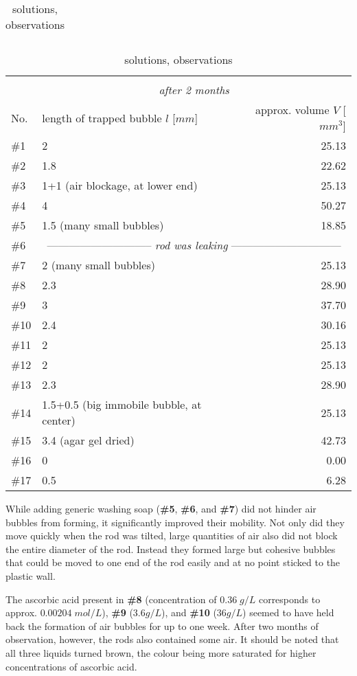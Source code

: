 \begin{table}[]
\begin{tabular}{l|lc|lc|lc}
\bottomrule
\end{tabular}
\begin{tabular}{l|lr}
\multicolumn{3}{c}{}								\\
& \multicolumn{2}{c}{\textit{after 2 months}}					\\ 
No. & length of trapped bubble $l$ [$mm$] 	& approx. volume $V$ [$mm^3$]	\\
\toprule
\#1   & 2					& 25.13				\\
\#2   & 1.8					& 22.62				\\
\#3   & 1+1 (air blockage, at lower end)	& 25.13				\\
\#4   & 4					& 50.27				\\
\#5   & 1.5 (many small bubbles)		& 18.85				\\
\#6   & \multicolumn{2}{c}{-----------------------------\textit{ rod was leaking }------------------------------}\\
\#7   & 2 (many small bubbles)			& 25.13				\\
\#8   & 2.3					& 28.90				\\
\#9   & 3					& 37.70				\\
\#10  & 2.4					& 30.16				\\
\#11  & 2					& 25.13				\\
\#12  & 2					& 25.13				\\
\#13  & 2.3					& 28.90				\\
\#14  & 1.5+0.5 (big immobile bubble, at center)	& 25.13				\\
\#15  & 3.4 (agar gel dried)			& 42.73				\\
\#16  & 0					& 0.00				\\
\#17  & 0.5					& 6.28				\\
\bottomrule
\end{tabular}
\caption{solutions, observations}
\label{tab:bubbles}
\end{table}


While adding generic washing soap (\textbf{\#5}, \textbf{\#6}, and \textbf{\#7}) did not hinder air bubbles from forming, it significantly improved their mobility.
Not only did they move quickly when the rod was tilted, large quantities of air also did not block the entire diameter of the rod.
Instead they formed large but cohesive bubbles that could be moved to one end of the rod easily and at no point sticked to the plastic wall.

The ascorbic acid present in \textbf{\#8} (concentration of $0.36 \; g/L$ corresponds to approx. $0.00204 \; mol/L$), \textbf{\#9} ($3.6 g/L$), and \textbf{\#10} ($36 g/L$) seemed to have held back the formation of air bubbles for up to one week.
After two months of observation, however, the rods also contained some air.
It should be noted that all three liquids turned brown, the colour being more saturated for higher concentrations of ascorbic acid.

